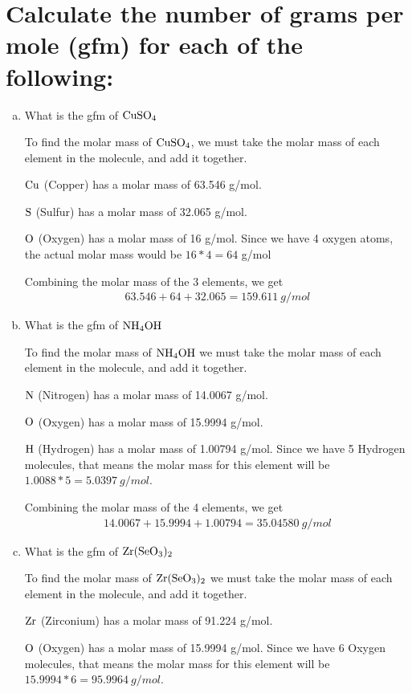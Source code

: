 \documentclass{scrartcl}
\begin{document}
\section{Calculate the number of grams per mole (gfm) for each of the following:}
\label{sec:org25f53ce}
\begin{enumerate}[(a)]
\item What is the gfm of \(\ce{CuSO4}\)

To find the molar mass of \(\ce{CuSO4}\), we must take the molar mass of
each element in the molecule, and add it together.

\(\ce{Cu}\) (Copper) has a molar mass of 63.546 g/mol.

\(\ce{S}\) (Sulfur) has a molar mass of 32.065 g/mol.

\(\ce{O}\) (Oxygen) has a molar mass of 16 g/mol. Since we have 4 oxygen
atoms, the actual molar mass would be \(16*4=64\) g/mol

Combining the molar mass of the 3 elements, we get
\begin{align*}
63.546+64+32.065=159.611\ g/mol
\end{align*}

\item What is the gfm of \(\ce{NH4OH}\)

To find the molar mass of \(\ce{NH4OH}\) we must take the molar mass of each element in the molecule, and add it together.

\(\ce{N}\) (Nitrogen) has a molar mass of 14.0067 g/mol.

\(\ce{O}\) (Oxygen) has a molar mass of 15.9994 g/mol.

\(\ce{H}\) (Hydrogen) has a molar mass of 1.00794 g/mol. Since we have 5
Hydrogen molecules, that means the molar mass for this element will be
\(1.0088*5=5.0397\ g/mol\).

Combining the molar mass of the 4 elements, we get
\begin{align*}
14.0067+15.9994+1.00794=35.04580\ g/mol
\end{align*}

\item What is the gfm of \(\ce{Zr(SeO3)2}\)

To find the molar mass of \(\ce{Zr(SeO3)2}\) we must take the molar mass of each element in the molecule, and add it together.

\(\ce{Zr}\) (Zirconium) has a molar mass of 91.224 g/mol.

\(\ce{O}\) (Oxygen) has a molar mass of 15.9994 g/mol. Since we have 6
Oxygen molecules, that means the molar mass for this element will be
\(15.9994*6=95.9964\ g/mol\).


\end{enumerate}
\end{document}
